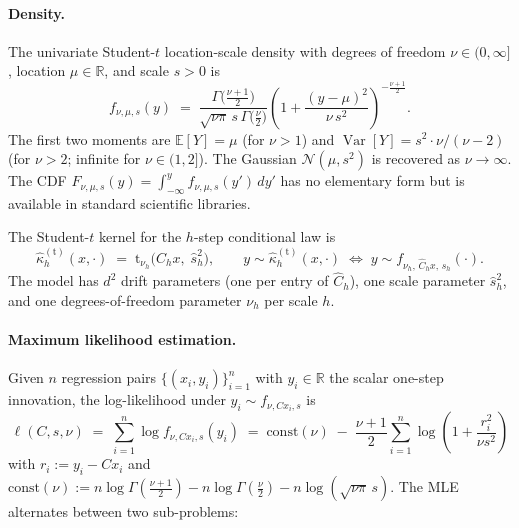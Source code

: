 \documentclass[11pt]{article}
\newcommand{\E}{\mathbb{E}}
\newcommand{\Rb}{\mathbb{R}}
\newcommand{\Nrm}{\mathcal{N}}
\newcommand{\Studt}{\mathrm{t}}
\DeclareMathOperator{\Var}{Var}
\theoremstyle{definition}
\theoremstyle{plain}
\begin{document}
\paragraph{Density.}
The univariate Student-$t$ location-scale density with degrees of
freedom $\nu \in (0, \infty]$, location $\mu \in \Rb$, and scale
$s > 0$ is
\begin{equation}
  \label{eq:t-density}
  f_{\nu, \mu, s}(y) \;=\;
  \frac{\Gamma\!\bigl(\tfrac{\nu+1}{2}\bigr)}
       {\sqrt{\nu \pi}\, s\, \Gamma\!\bigl(\tfrac{\nu}{2}\bigr)}
  \left(1 + \frac{(y - \mu)^{2}}{\nu\, s^{2}}\right)^{-\frac{\nu+1}{2}}.
\end{equation}
The first two moments are $\E[Y] = \mu$ (for $\nu > 1$) and
$\Var[Y] = s^{2} \cdot \nu / (\nu - 2)$ (for $\nu > 2$;
infinite for $\nu \in (1, 2]$). The Gaussian
$\Nrm(\mu, s^{2})$ is recovered as $\nu \to \infty$. The CDF
$F_{\nu, \mu, s}(y) = \int_{-\infty}^{y} f_{\nu, \mu, s}(y')\, dy'$ has
no elementary form but is available in standard scientific libraries.

The Student-$t$ kernel for the $h$-step conditional law is
\begin{equation}
  \label{eq:t-kernel}
  \hat\kappa_h^{(\Studt)}(x, \cdot) \;=\;
  \Studt_{\nu_h}\!\bigl(\hat C_h x,\; \hat s_h^{2}\bigr),
  \qquad y \sim \hat\kappa_h^{(\Studt)}(x, \cdot)
  \;\Leftrightarrow\;
  y \sim f_{\nu_h,\, \hat C_h x,\, \hat s_h}(\cdot).
\end{equation}
The model has $d^{2}$ drift parameters (one per entry of $\hat C_h$),
one scale parameter $\hat s_h^{2}$, and one degrees-of-freedom
parameter $\nu_h$ per scale $h$.

\paragraph{Maximum likelihood estimation.}
Given $n$ regression pairs $\{(x_i, y_i)\}_{i=1}^{n}$ with $y_i \in \Rb$ the
scalar one-step innovation, the log-likelihood under
$y_i \sim f_{\nu, C x_i, s}$ is
\begin{equation}
  \label{eq:t-loglik}
  \ell(C, s, \nu) \;=\; \sum_{i=1}^{n} \log f_{\nu, C x_i, s}(y_i)
  \;=\; \text{const}(\nu)
    \;-\; \frac{\nu + 1}{2} \sum_{i=1}^{n}
      \log\!\left(1 + \frac{r_i^{2}}{\nu s^{2}}\right)
\end{equation}
with $r_i := y_i - C x_i$ and $\text{const}(\nu)
:= n \log \Gamma(\tfrac{\nu+1}{2}) - n \log \Gamma(\tfrac{\nu}{2})
- n \log(\sqrt{\nu \pi}\, s)$. The MLE alternates between two
sub-problems:
\end{document}
